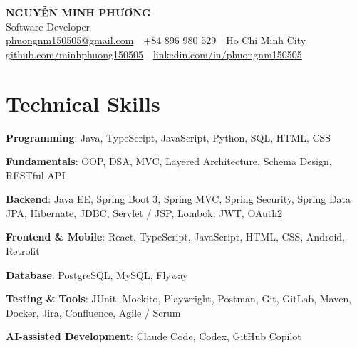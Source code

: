 \documentclass[10pt, a4paper]{article}
\newcommand{\skillrow}[2]{\textbf{#1}: #2\par}
\begin{document}
\color{BodyText}

\begin{center}
  {\fontsize{21pt}{25pt}\selectfont\bfseries\color{NavyBlue} NGUYỄN MINH PHƯƠNG}\\[3pt]
  {\fontsize{12.5pt}{15pt}\selectfont\color{MutedText} Software Developer}\\[4pt]
  {\footnotesize
  \href{mailto:phuongnm150505@gmail.com}{phuongnm150505@gmail.com}
  \,\textbar\, +84 896 980 529
  \,\textbar\, Ho Chi Minh City
  \,\textbar\, \href{https://github.com/minhphuong150505}{github.com/minhphuong150505}
  \,\textbar\, \href{https://www.linkedin.com/in/phuongnm150505/}{linkedin.com/in/phuongnm150505}}
\end{center}
\vspace{-6pt}

\section{Technical Skills}
\skillrow{Programming}{Java, TypeScript, JavaScript, Python, SQL, HTML, CSS}
\skillrow{Fundamentals}{OOP, DSA, MVC, Layered Architecture, Schema Design, RESTful API}
\skillrow{Backend}{Java EE, Spring Boot 3, Spring MVC, Spring Security, Spring Data JPA, Hibernate, JDBC, Servlet / JSP, Lombok, JWT, OAuth2}
\skillrow{Frontend \& Mobile}{React, TypeScript, JavaScript, HTML, CSS, Android, Retrofit}
\skillrow{Database}{PostgreSQL, MySQL, Flyway}
\skillrow{Testing \& Tools}{JUnit, Mockito, Playwright, Postman, Git, GitLab, Maven, Docker, Jira, Confluence, Agile / Scrum}
\skillrow{AI-assisted Development}{Claude Code, Codex, GitHub Copilot}

\end{document}
